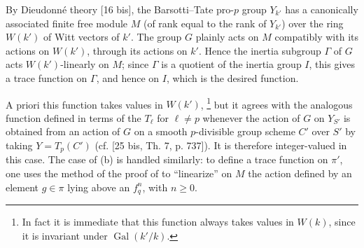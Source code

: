 By Dieudonn\'e theory [16 bis], the Barsotti--Tate pro-$p$ group $Y_{k'}$
has a canonically associated finite free module $M$ (of rank equal to
the rank of $Y_{k'}$) over the ring $W(k')$ of Witt vectors of $k'$.
The group $G$ plainly acts on $M$ compatibly with its actions on
$W(k')$, through its actions on $k'$.  Hence the inertia subgroup
$\Gamma$ of $G$ acts $W(k')$-linearly on $M$; since $\Gamma$ is a
quotient of the inertia group $I$, this gives a trace function on
$\Gamma$, and hence on $I$, which is the desired function.

A priori this function takes values in $W(k')$,
\footnote{In fact it is immediate that this function always takes values
in $W(k)$, since it is invariant under $\operatorname{Gal}(k'/k)$.}
but it agrees with the analogous function defined in terms of the
$T_\ell$ for $\ell\neq p$ whenever the action of $G$ on $Y_{S'}$ is
obtained from an action of $G$ on a smooth $p$-divisible group scheme
$C'$ over $S'$ by taking $Y=T_p(C')$ (cf. [25 bis, Th. 7, p. 737]).
It is therefore integer-valued in this case.  The case of (b) is
handled similarly: to define a trace function on $\pi'$, one uses the
method of the proof of  to ``linearize'' on $M$ the action defined
by an element $g\in\pi$ lying above an $f_q^n$, with $n\geq0$.
